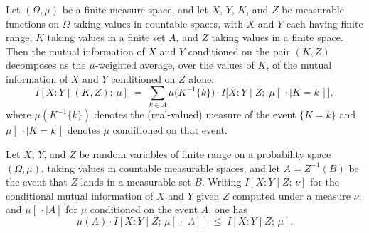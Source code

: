 \begin{theorem}
\label{ProbabilityTheory.condMutualInfo_prod_conditioning_eq_sum}
\leanok
{}
Let $(\Omega,\mu)$ be a finite measure space, and let $X$, $Y$, $K$, and $Z$ be
measurable functions on $\Omega$ taking values in countable spaces, with $X$ and $Y$
each having finite range, $K$ taking values in a finite set $A$, and $Z$ taking values
in a finite space. Then the mutual information of $X$ and $Y$ conditioned on the pair
$(K,Z)$ decomposes as the $\mu$-weighted average, over the values of $K$, of the mutual
information of $X$ and $Y$ conditioned on $Z$ alone:
\[
  I[X : Y \mid (K,Z);\,\mu]
\;=\; \sum_{k \in A} \mu\bigl(K^{-1}\{k\}\bigr)\cdot I\bigl[X : Y \mid Z;\; \mu[\,\cdot
\mid K = k\,]\bigr],
\]
where $\mu(K^{-1}\{k\})$ denotes the (real-valued) measure of the event $\{K = k\}$ and
$\mu[\,\cdot \mid K = k\,]$ denotes $\mu$ conditioned on that event.
\end{theorem}

\begin{theorem}
\label{ProbabilityTheory.measureReal_mul_cond_condMutualInfo_le_condMutualInfo_of_event_eq_preimage}
\leanok
{}
Let $X$, $Y$, and $Z$ be random variables of finite range on a probability space
$(\Omega, \mu)$, taking values in countable measurable spaces, and let $A = Z^{-1}(B)$
be the event that $Z$ lands in a measurable set $B$. Writing $I[X : Y \mid Z;\, \nu]$
for the conditional mutual information of $X$ and $Y$ given $Z$ computed under a measure
$\nu$, and $\mu[\,\cdot \mid A]$ for $\mu$ conditioned on the event $A$, one has
\[
  \mu(A) \cdot I[X : Y \mid Z;\, \mu[\,\cdot \mid A]] \;\le\; I[X : Y \mid Z;\, \mu].
\]
\end{theorem}

